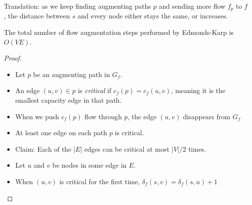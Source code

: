 \documentclass[11  pt]{article}
\begin{document}
Translation: as we keep finding augmenting paths $p$ and sending more flow $f_p$ to $f$, the distance between $s$ and every node either stays the same, or increases. \\


\newpage

\begin{theorem}
	The total number of flow augmentation steps performed by Edmonds-Karp is $O(VE)$.
\end{theorem}

\begin{proof}
	
	
	\begin{itemize}
		\item Let $p$ be an augmenting path in $G_f$.\\
		
		\item An edge $(u,v) \in p$ is \emph{critical} if $c_f(p) = c_f(u,v)$, meaning it is the smallest capacity edge in that path. \\
		
		\item When we push $c_f(p)$ flow through $p$, the edge $(u,v)$ disappears from $G_f$
		
		\vs{2cm}
		
		
		\item At least one edge on each path $p$ is critical.
		
		
		\item Claim: Each of the $|E|$ edges can be critical at most $|V|/2$ times.
		
	\end{itemize}
	\newpage
	\begin{itemize}
		
		\textbf{Proving the claim}: (u,v) becomes critical at most $|V|/2$ times.
		
		\item Let $u$ and $v$ be nodes in some edge in $E$. \\
		\item When $(u,v)$ is critical for the first time, $\delta_f(s,v) = \delta_f(s,u) + 1$ \\
		

\end{itemize}
\end{proof}
\end{document}
